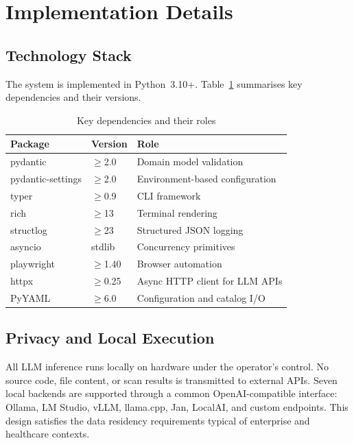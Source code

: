 \documentclass[10pt,conference]{IEEEtran}
\begin{document}
\section{Implementation Details}
\label{sec:impl}

\subsection{Technology Stack}

The system is implemented in Python~3.10+.  Table~\ref{tab:stack} summarises
key dependencies and their versions.

\begin{table}[htbp]
\caption{Key dependencies and their roles}
\label{tab:stack}
\centering\small
\begin{tabularx}{\columnwidth}{llX}
\toprule
\textbf{Package} & \textbf{Version} & \textbf{Role} \\
\midrule
pydantic        & $\geq$2.0  & Domain model validation \\
pydantic-settings & $\geq$2.0 & Environment-based configuration \\
typer           & $\geq$0.9  & CLI framework \\
rich            & $\geq$13   & Terminal rendering \\
structlog       & $\geq$23   & Structured JSON logging \\
asyncio         & stdlib     & Concurrency primitives \\
playwright      & $\geq$1.40 & Browser automation \\
httpx           & $\geq$0.25 & Async HTTP client for LLM APIs \\
PyYAML          & $\geq$6.0  & Configuration and catalog I/O \\
\bottomrule
\end{tabularx}
\end{table}

\subsection{Privacy and Local Execution}

All LLM inference runs locally on hardware under the operator's control.  No
source code, file content, or scan results is transmitted to external APIs.
Seven local backends are supported through a common OpenAI-compatible
interface: Ollama, LM Studio, vLLM, llama.cpp, Jan, LocalAI, and custom
endpoints.  This design satisfies the data residency requirements typical of
enterprise and healthcare contexts.
\end{document}

